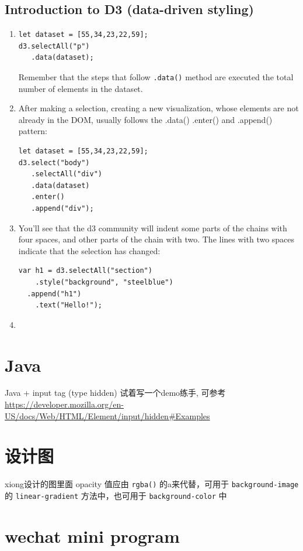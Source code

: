 \documentclass[a4paper, 12pt]{article}
\begin{document}
\subsection{Introduction to D3 (data-driven styling)}
\begin{enumerate}
\item 
\begin{verbatim}
let dataset = [55,34,23,22,59];
d3.selectAll("p")
   .data(dataset);
\end{verbatim}
Remember that the steps that follow \verb|.data()| method are executed the total number of elements in the dataset.

\item 
After making a selection, creating a new visualization, whose elements are not already in the DOM, usually follows the .data() .enter() and .append() pattern:
\begin{verbatim}
let dataset = [55,34,23,22,59];
d3.select("body")
   .selectAll("div")
   .data(dataset)
   .enter()
   .append("div");
\end{verbatim}

\item You'll see that the d3 community will indent some parts of the chains with four spaces, and other parts of the chain with two. The lines with two spaces indicate that the selection has changed:
\begin{verbatim}
var h1 = d3.selectAll("section")
    .style("background", "steelblue")
  .append("h1")
    .text("Hello!");
\end{verbatim}

\item 

\end{enumerate}

\section{Java}
Java + input tag (type hidden) 试着写一个demo练手, 可参考 \url{https://developer.mozilla.org/en-US/docs/Web/HTML/Element/input/hidden#Examples}


\section{设计图}
xiong设计的图里面 opacity 值应由 \verb|rgba()| 的a来代替，可用于 \verb|background-image| 的 \verb|linear-gradient| 方法中，也可用于 \verb|background-color| 中


\section{wechat mini program}
\end{document}

